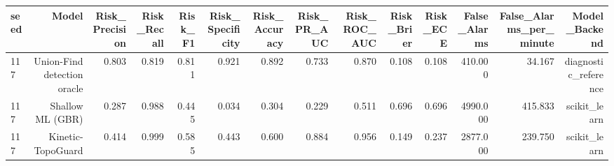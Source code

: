 \begin{tabular}{lrrrrrrrrrrrrr}
\toprule
seed & Model & Risk\_Precision & Risk\_Recall & Risk\_F1 & Risk\_Specificity & Risk\_Accuracy & Risk\_PR\_AUC & Risk\_ROC\_AUC & Risk\_Brier & Risk\_ECE & False\_Alarms & False\_Alarms\_per\_minute & Model\_Backend \\
\midrule
117 & Union-Find detection oracle & 0.803 & 0.819 & 0.811 & 0.921 & 0.892 & 0.733 & 0.870 & 0.108 & 0.108 & 410.000 & 34.167 & diagnostic\_reference \\
117 & Shallow ML (GBR) & 0.287 & 0.988 & 0.445 & 0.034 & 0.304 & 0.229 & 0.511 & 0.696 & 0.696 & 4990.000 & 415.833 & scikit\_learn \\
117 & Kinetic-TopoGuard & 0.414 & 0.999 & 0.585 & 0.443 & 0.600 & 0.884 & 0.956 & 0.149 & 0.237 & 2877.000 & 239.750 & scikit\_learn \\
\bottomrule
\end{tabular}